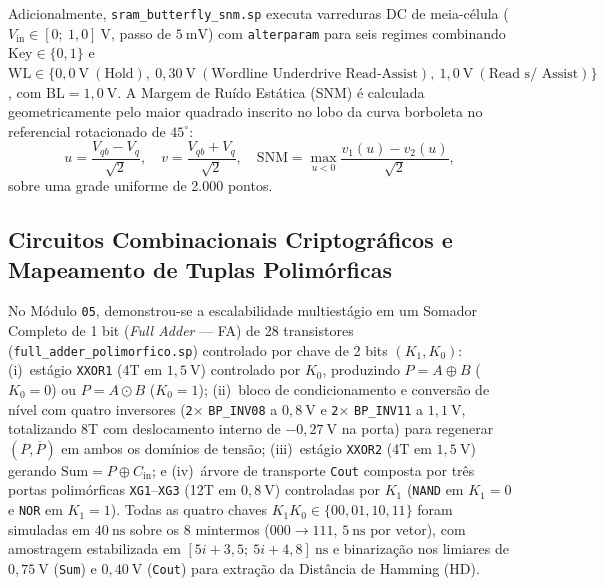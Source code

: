 Adicionalmente, \texttt{sram\_butterfly\_snm.sp} executa varreduras DC de meia-c\'{e}lula ($V_{\mathrm{in}} \in [0;\ 1{,}0]\ \text{V}$, passo de $5\ \text{mV}$) com \texttt{alterparam} para seis regimes combinando $\text{Key} \in \{0, 1\}$ e $\mathrm{WL} \in \{0{,}0\ \text{V}\ (\text{Hold}),\ 0{,}30\ \text{V}\ (\text{Wordline Underdrive Read-Assist}),\ 1{,}0\ \text{V}\ (\text{Read s/ Assist})\}$, com $\mathrm{BL}=1{,}0\ \text{V}$. A Margem de Ru\'{i}do Est\'{a}tica (SNM) \'{e} calculada geometricamente pelo maior quadrado inscrito no lobo da curva borboleta no referencial rotacionado de $45^\circ$:
\begin{equation}\label{eq:snm_45}
u = \frac{V_{qb} - V_q}{\sqrt{2}}, \quad v = \frac{V_{qb} + V_q}{\sqrt{2}}, \quad \mathrm{SNM} = \max_{u < 0} \frac{v_1(u) - v_2(u)}{\sqrt{2}},
\end{equation}
sobre uma grade uniforme de 2.000 pontos.

\subsection{Circuitos Combinacionais Criptogr\'{a}ficos e Mapeamento de Tuplas Polim\'{o}rficas}\label{sec:met_comb_tuplas}

No M\'{o}dulo \texttt{05}, demonstrou-se a escalabilidade multiest\'{a}gio em um Somador Completo de 1 bit (\textit{Full Adder} --- FA) de 28 transistores (\texttt{full\_adder\_polimorfico.sp}) controlado por chave de 2 bits $(K_1, K_0)$: (i)~est\'{a}gio \texttt{XXOR1} (4T em $1{,}5\ \text{V}$) controlado por $K_0$, produzindo $P = A \oplus B$ ($K_0=0$) ou $P = A \odot B$ ($K_0=1$); (ii)~bloco de condicionamento e convers\~{a}o de n\'{i}vel com quatro inversores (\texttt{2}$\times$ \texttt{BP\_INV08} a $0{,}8\ \text{V}$ e \texttt{2}$\times$ \texttt{BP\_INV11} a $1{,}1\ \text{V}$, totalizando 8T com deslocamento interno de $-0{,}27\ \text{V}$ na porta) para regenerar $(P, \overline{P})$ em ambos os dom\'{i}nios de tens\~{a}o; (iii)~est\'{a}gio \texttt{XXOR2} (4T em $1{,}5\ \text{V}$) gerando $\mathrm{Sum} = P \oplus C_{\mathrm{in}}$; e (iv)~\'{a}rvore de transporte \texttt{Cout} composta por tr\^{e}s portas polim\'{o}rficas \texttt{XG1}--\texttt{XG3} (12T em $0{,}8\ \text{V}$) controladas por $K_1$ (\texttt{NAND} em $K_1=0$ e \texttt{NOR} em $K_1=1$). Todas as quatro chaves $K_1 K_0 \in \{00, 01, 10, 11\}$ foram simuladas em $40\ \text{ns}$ sobre os 8 mintermos ($000 \to 111$, $5\ \text{ns}$ por vetor), com amostragem estabilizada em $[5i+3{,}5;\ 5i+4{,}8]\ \text{ns}$ e binariza\c{c}\~{a}o nos limiares de $0{,}75\ \text{V}$ (\texttt{Sum}) e $0{,}40\ \text{V}$ (\texttt{Cout}) para extra\c{c}\~{a}o da Dist\^{a}ncia de Hamming (HD).

